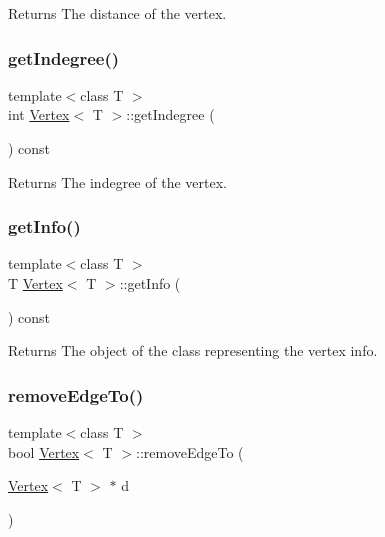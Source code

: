 \begin{DoxyReturn}{Returns}
The distance of the vertex. 
\end{DoxyReturn}
\mbox{\label{class_vertex_ac78980191ea1f9d22e6617e9e511b755}} 
\subsubsection{\texorpdfstring{get\+Indegree()}{getIndegree()}}
{\footnotesize\ttfamily template$<$class T $>$ \\
int \hyperlink{class_vertex}{Vertex}$<$ T $>$\+::get\+Indegree (\begin{DoxyParamCaption}{ }\end{DoxyParamCaption}) const}

\begin{DoxyReturn}{Returns}
The indegree of the vertex. 
\end{DoxyReturn}
\mbox{\label{class_vertex_a48eae2f7af2362634adab02b7b2dbec6}} 
\subsubsection{\texorpdfstring{get\+Info()}{getInfo()}}
{\footnotesize\ttfamily template$<$class T $>$ \\
T \hyperlink{class_vertex}{Vertex}$<$ T $>$\+::get\+Info (\begin{DoxyParamCaption}{ }\end{DoxyParamCaption}) const}

\begin{DoxyReturn}{Returns}
The object of the class representing the vertex info. 
\end{DoxyReturn}
\mbox{\label{class_vertex_ab2b5b43fb1709a901b78718436763a84}} 
\subsubsection{\texorpdfstring{remove\+Edge\+To()}{removeEdgeTo()}}
{\footnotesize\ttfamily template$<$class T $>$ \\
bool \hyperlink{class_vertex}{Vertex}$<$ T $>$\+::remove\+Edge\+To (\begin{DoxyParamCaption}\item[{\hyperlink{class_vertex}{Vertex}$<$ T $>$ $\ast$}]{d }\end{DoxyParamCaption})}



